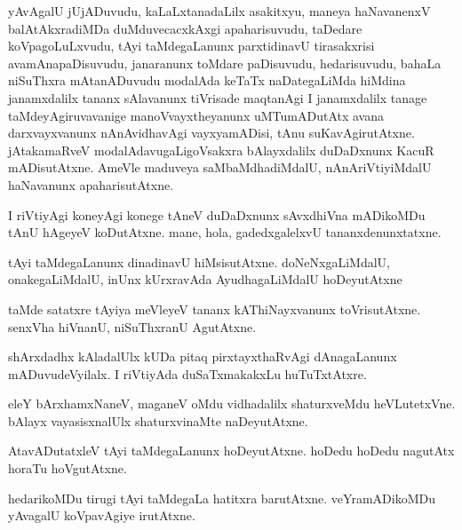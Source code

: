 \documentclass{article}
\begin{document}
\begin{mn}
yAvAgalU jUjADuvudu, kaLaLxtanadaLilx asakitxyu, maneya haNavanenxV balAtAkxradiMDa
 duMduvecacxkAxgi apaharisuvudu, taDedare koVpagoLuLxvudu, tAyi taMdegaLanunx 
 parxtidinavU tirasakxrisi avamAnapaDisuvudu, janaranunx toMdare paDisuvudu,
 hedarisuvudu,  bahaLa niSuThxra mAtanADuvudu modalAda keTaTx naDategaLiMda 
 hiMdina janamxdalilx tananx sAlavanunx tiVrisade maqtanAgi I janamxdalilx 
 tanage taMdeyAgiruvavanige manoVvayxtheyanunx uMTumADutAtx avana darxvayxvanunx 
 nAnAvidhavAgi vayxyamADisi, tAnu suKavAgirutAtxne. jAtakamaRveV modalAdavugaLigoVsakxra 
 bAlayxdalilx duDaDxnunx KacuR mADisutAtxne. AmeVle maduveya saMbaMdhadiMdalU, 
 nAnAriVtiyiMdalU haNavanunx apaharisutAtxne.
\end{mn}

\begin{mn}
I riVtiyAgi koneyAgi konege tAneV duDaDxnunx sAvxdhiVna mADikoMDu tAnU hAgeyeV 
koDutAtxne. mane, hola, gadedxgalelxvU tananxdenunxtatxne.
\end{mn}

\begin{mn}
tAyi taMdegaLanunx dinadinavU hiMsisutAtxne. doNeNxgaLiMdalU, onakegaLiMdalU, 
inUnx kUrxravAda AyudhagaLiMdalU hoDeyutAtxne
\end{mn}

\begin{mn}
taMde satatxre tAyiya meVleyeV tananx kAThiNayxvanunx toVrisutAtxne.
senxVha hiVnanU, niSuThxranU AgutAtxne. 
\end{mn}

\begin{mn}
shArxdadhx kAladalUlx kUDa pitaq pirxtayxthaRvAgi dAnagaLanunx mADuvudeVyilalx. 
 I riVtiyAda duSaTxmakakxLu huTuTxtAtxre. 
\end{mn}

\begin{mn}
eleY bArxhamxNaneV, maganeV oMdu vidhadalilx shaturxveMdu heVLutetxVne.
 bAlayx vayasisxnalUlx shaturxvinaMte naDeyutAtxne.
\end{mn}

\begin{mn}
AtavADutatxleV tAyi taMdegaLanunx hoDeyutAtxne. hoDedu hoDedu nagutAtx 
horaTu hoVgutAtxne.
\end{mn}

\begin{mn}
hedarikoMDu tirugi tAyi taMdegaLa hatitxra barutAtxne.  veYramADikoMDu 
yAvagalU koVpavAgiye irutAtxne.
\end{mn}
\end{document}
